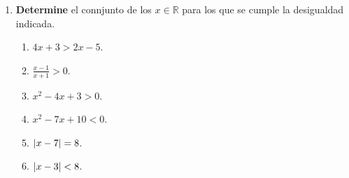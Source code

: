 \documentclass[12pt]{article}
\begin{document}
\begin{enumerate}
\begin{proof}
\begin{equation*}
\begin{split}
                &\Rightarrow \frac{a^2}{2}+\frac{b^2}{2} \geq -ab \\
                &\Rightarrow 1+\frac{a^2}{2}+\frac{b^2}{2} \geq 1-ab \\
                &\Rightarrow 1+a^2+b^2+a^2b^2 \geq 1-ab \\
                &\Rightarrow \left(1+a^2\right)\left(1+b^2\right) \geq 1-ab
            \end{split}
        \end{equation*}
        De forma similar, obtenemos también que:
        \begin{equation*}
            -\left(1+a^2\right)\left(1+b^2\right) \leq 1-ab
        \end{equation*}
        Por tanto:
        \begin{equation*}
            \abs{1-ab}\leq\left(1+a^2\right)\left(1+b^2\right)
        \end{equation*}
        Dividiendo ambos lados por $\left(1+a^2\right)\left(1+b^2\right)>0$, se tiene:
        \begin{equation*}
            \frac{\abs{1-ab}}{\left(1+a^2\right)\left(1+b^2\right)}\leq1
        \end{equation*}
        De esta forma, sustituyendo en la primera parte:
        \begin{equation*}
            \begin{split}
                \abs{\frac{a}{1+a^2}-\frac{b}{1+b^2}} &= \frac{\abs{a-b}\abs{1-ab}}{\abs{\left(1+a^2\right)\left(1+b^2\right)}} \\
                &\leq \abs{a-b}\cdot1 \\
                &= \abs{a-b}
            \end{split}
        \end{equation*}
        \qed
    \end{proof}
    \item \textbf{Determine} el connjunto de los $x\in\mathbb{R}$ para los que se cumple la desigualdad indicada.
    \begin{multicols}{2}
        \begin{enumerate}
            \item $4x+3 > 2x-5$.
            \item $\frac{x-1}{x+1}>0$.
            \item $x^2-4x+3>0$.
            \item $x^2-7x+10<0$.
            \item $\left| x-7 \right|=8$.
            \item $\left| x-3 \right|<8$.

\end{enumerate}
\end{multicols}
\end{enumerate}
\end{document}
